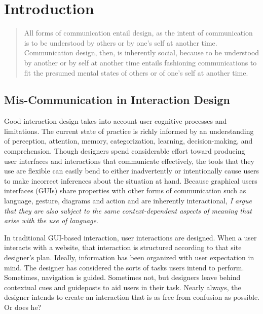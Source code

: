 \chapter{Introduction}
\label{introduction}

 \begin{quote} 

All forms of communication entail design, as the intent of communication is to be understood by others or by one's self at another time. Communication design, then, is inherently social, because to be understood by another or by self at another time entails fashioning communications to fit the presumed mental states of others or of one's self at another time.  \citep[p. 6]{Tversky:2010ww} 
 \end{quote} 

\section{Mis-Communication in Interaction Design}
\label{mis-communicationininteractiondesign}

Good interaction design takes into account user cognitive processes and limitations. The current state of practice is richly informed by an understanding of perception, attention, memory, categorization, learning, decision-making, and comprehension. Though designers spend considerable effort toward producing user interfaces and interactions that communicate effectively, the tools that they use are flexible can easily bend to either inadvertently or intentionally cause users to make incorrect inferences about the situation at hand. Because graphical users interfaces (GUIs) share properties with other forms of communication such as language, gesture, diagrams and action and are inherently interactional, \emph{I argue that they are also subject to the same context-dependent aspects of meaning that arise with the use of language}. 

In traditional GUI-based interaction, user interactions are designed. When a user interacts with a website, that interaction is structured according to that site designer's plan. Ideally, information has been organized with user expectation in mind. The designer has considered the sorts of tasks users intend to perform. Sometimes, navigation is guided. Sometimes not, but designers leave behind contextual cues and guideposts to aid users in their task. Nearly always, the designer intends to create an interaction that is as free from confusion as possible. Or does he?

